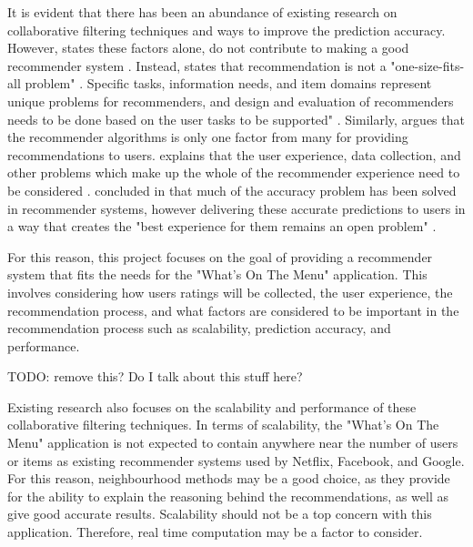 It is evident that there has been an abundance of existing research on collaborative filtering techniques and ways to improve the prediction accuracy. However, \citeauthor{schafer2007collaborative} states these factors alone, do not contribute to making a good recommender system \cite{schafer2007collaborative}. Instead, \citeauthor{schafer2007collaborative} states that recommendation is not a "one-size-fits-all problem"  \cite{schafer2007collaborative}. Specific tasks, information needs, and item domains represent unique problems for recommenders, and design and evaluation of recommenders needs to be done based on the user tasks to be supported" \cite{schafer2007collaborative}. Similarly, \citeauthor{martin2009recsys} argues that the recommender algorithms is only one factor from many for providing recommendations to users. \citeauthor{martin2009recsys} explains that the user experience, data collection, and other problems which make up the whole of the recommender experience need to be considered \cite{schafer2007collaborative, martin2009recsys}. \citeauthor{interface} concluded in \cite{interface} that much of the accuracy problem has been solved in recommender systems, however delivering these accurate predictions to users in a way that creates the "best experience for them remains an open problem" \cite{interface}. 

For this reason, this project focuses on the goal of providing a recommender system that fits the needs for the "What's On The Menu" application. This involves considering how users ratings will be collected, the user experience, the recommendation process, and what factors are considered to be important in the recommendation process such as scalability, prediction accuracy, and performance.








TODO: remove this? Do I talk about this stuff here?


Existing research also focuses on the scalability and performance of these collaborative filtering techniques. In terms of scalability, the "What's On The Menu" application is not expected to contain anywhere near the number of users or items as existing recommender systems used by Netflix, Facebook, and Google. For this reason, neighbourhood methods may be a good choice, as they provide for the ability to explain the reasoning behind the recommendations, as well as give good accurate results. Scalability should not be a top concern with this application. Therefore, real time computation may be a factor to consider. 

